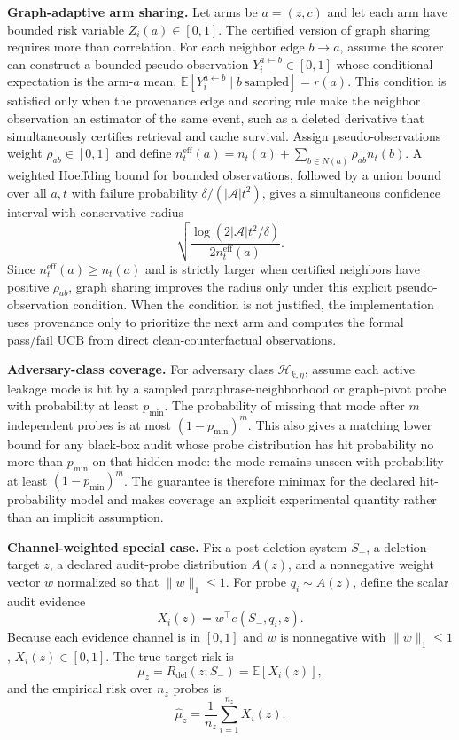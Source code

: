 \documentclass[10pt,journal,compsoc]{IEEEtran}
\begin{document}
\textbf{Graph-adaptive arm sharing.}
Let arms be $a=(z,c)$ and let each arm have bounded risk variable $Z_i(a)\in[0,1]$. The certified version of graph sharing requires more than correlation. For each neighbor edge $b\to a$, assume the scorer can construct a bounded pseudo-observation $Y_i^{a\leftarrow b}\in[0,1]$ whose conditional expectation is the arm-$a$ mean, $\mathbb{E}[Y_i^{a\leftarrow b}\mid b\ \mathrm{sampled}]=r(a)$. This condition is satisfied only when the provenance edge and scoring rule make the neighbor observation an estimator of the same event, such as a deleted derivative that simultaneously certifies retrieval and cache survival. Assign pseudo-observations weight $\rho_{ab}\in[0,1]$ and define $n_t^{\mathrm{eff}}(a)=n_t(a)+\sum_{b\in N(a)}\rho_{ab}n_t(b)$. A weighted Hoeffding bound for bounded observations, followed by a union bound over all $a,t$ with failure probability $\delta/(|\mathcal{A}|t^2)$, gives a simultaneous confidence interval with conservative radius
\[
\sqrt{\frac{\log(2|\mathcal{A}|t^2/\delta)}{2n_t^{\mathrm{eff}}(a)}}.
\]
Since $n_t^{\mathrm{eff}}(a)\geq n_t(a)$ and is strictly larger when certified neighbors have positive $\rho_{ab}$, graph sharing improves the radius only under this explicit pseudo-observation condition. When the condition is not justified, the implementation uses provenance only to prioritize the next arm and computes the formal pass/fail UCB from direct clean-counterfactual observations.

\textbf{Adversary-class coverage.}
For adversary class $\mathcal{H}_{k,\eta}$, assume each active leakage mode is hit by a sampled paraphrase-neighborhood or graph-pivot probe with probability at least $p_{\min}$. The probability of missing that mode after $m$ independent probes is at most $(1-p_{\min})^m$. This also gives a matching lower bound for any black-box audit whose probe distribution has hit probability no more than $p_{\min}$ on that hidden mode: the mode remains unseen with probability at least $(1-p_{\min})^m$. The guarantee is therefore minimax for the declared hit-probability model and makes coverage an explicit experimental quantity rather than an implicit assumption.

\textbf{Channel-weighted special case.}
Fix a post-deletion system $S_-$, a deletion target $z$, a declared audit-probe distribution $A(z)$, and a nonnegative weight vector $w$ normalized so that $\|w\|_1\leq 1$. For probe $q_i\sim A(z)$, define the scalar audit evidence
\[
X_i(z)=w^\top e(S_-,q_i,z).
\]
Because each evidence channel is in $[0,1]$ and $w$ is nonnegative with $\|w\|_1\leq 1$, $X_i(z)\in[0,1]$. The true target risk is
\[
\mu_z=R_{\mathrm{del}}(z;S_-)=\mathbb{E}[X_i(z)],
\]
and the empirical risk over $n_z$ probes is
\[
\hat\mu_z=\frac{1}{n_z}\sum_{i=1}^{n_z} X_i(z).
\]
\end{document}
